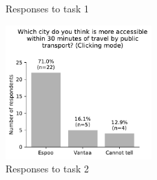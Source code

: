 \begin{appendices}
\begin{figure}[H]
\begin{subfigure}[b]{0.5\textwidth}
	\end{subfigure}%
	\caption{Responses to task 1}
	\label{fig:task 1}
\end{figure}

\begin{figure}[H]
	\centering
	\includegraphics[width=0.5\textwidth]{visual/figures/survey/2.pdf}
	\caption{Responses to task 2}
	\label{fig:task 2}
\end{figure}


\end{appendices}
